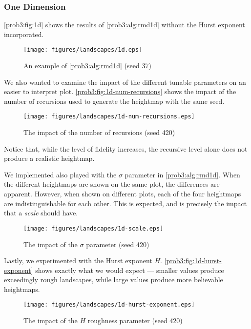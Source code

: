 \subsubsection{One Dimension}
\autoref{prob3:fig:1d} shows the results of \autoref{prob3:alg:rmd1d} without the Hurst exponent incorporated.
\begin{figure}[H]
    \centering
    \texttt{[image: figures/landscapes/1d.eps]}
    \caption{An example of \autoref{prob3:alg:rmd1d} (seed 37)}\label{prob3:fig:1d}
\end{figure}

We also wanted to examine the impact of the different tunable parameters on an easier to interpret plot.
\autoref{prob3:fig:1d-num-recursions} shows the impact of the number of recursions used to generate the heightmap with the same seed.
\begin{figure}[H]
    \centering
    \texttt{[image: figures/landscapes/1d-num-recursions.eps]}
    \caption{The impact of the number of recursions (seed 420)}\label{prob3:fig:1d-num-recursions}
\end{figure}
Notice that, while the level of fidelity increases, the recursive level alone does not produce a realistic heightmap.

We implemented also played with the $\sigma$ parameter in \autoref{prob3:alg:rmd1d}. When the different heightmaps are shown on the same plot, the differences are apparent.
However, when shown on different plots, each of the four heightmaps are indistinguishable for each other.
This is expected, and is precisely the impact that a \textit{scale} should have.

\begin{figure}[H]
    \centering
    \texttt{[image: figures/landscapes/1d-scale.eps]}
    \caption{The impact of the $\sigma$ parameter (seed 420)}\label{prob3:fig:1d-scale}
\end{figure}

Lastly, we experimented with the Hurst exponent $H$.
\autoref{prob3:fig:1d-hurst-exponent} shows exactly what we would expect --- smaller values produce exceedingly rough landscapes, while large values produce more believable heightmaps.

\begin{figure}[H]
    \centering
    \texttt{[image: figures/landscapes/1d-hurst-exponent.eps]}
    \caption{The impact of the $H$ roughness parameter (seed 420)}\label{prob3:fig:1d-hurst-exponent}
\end{figure}

